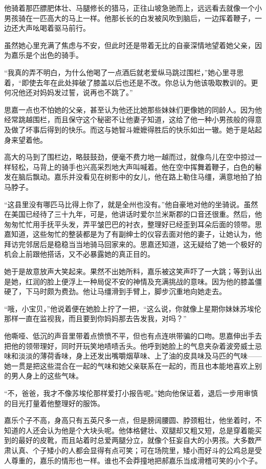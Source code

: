 \par 他骑着那匹膘肥体壮、马腿修长的猎马，正往山坡急驰而上，远远看去就像一个小男孩骑在一匹高大的马上一样。他那长长的白发被风吹到脑后，一边挥着鞭子，一边还大声吆喝着驱马前行。
\par 虽然她心里充满了焦虑与不安，但此时还是带着无比的自豪深情地望着她父亲，因为嘉乐是个出色的骑手。
\par “我真的弄不明白，为什么他喝了一点酒后就老爱纵马跳过围栏，”她心里寻思着，“即使去年在此处摔破了膝盖以后也还是不改。你总认为他该吸取教训的。更何况他还对妈妈发过誓，说再也不跳了。”
\par 思嘉一点也不怕她的父亲，甚至认为他还比她那些妹妹们更像她的同龄人。因为他经常跳越围栏，而且保守这个秘密不让他妻子知道，这给了他一种小男孩般的得意及做了坏事后得到的快乐。而这与她智斗嬷嬷得胜后的快乐如出一辙。她于是站起身来望着他。
\par 高大的马到了围栏边，略鼓鼓劲，便毫不费力地一越而过，就像鸟儿在空中掠过一样轻松，马背上的骑手也兴高采烈地大声叫喊着。他在空中挥舞着鞭子，白色的鬈发在脑后飘动。嘉乐并没看见在树影中的女儿，他在路上勒住马缰，满意地拍了拍马脖子。
\par “这县里没有哪匹马比得上你了，就是全州也没有。”他自豪地对他的坐骑说。虽然在美国已经待了三十九年，可是，他讲话时爱尔兰米斯郡的口音还很重。然后，他匆匆忙忙用手抚平头发，弄平皱巴巴的衬衣，整理好已经歪到耳朵后面的领带。思嘉知道，这些匆忙的整装都是为了有副绅士的仪容去面对他的妻子，让她认为，他拜访完邻居后是稳稳当当地骑马回家来的。思嘉还知道，这无疑给了她一个极好的机会上前跟他搭话，又不必暴露她的真正目的。
\par 她于是故意放声大笑起来。果然不出她所料，嘉乐被这笑声吓了一大跳；等到认出是她，红润的脸上便浮上一种局促不安的神情及充满挑战的意味。因为他的膝盖僵硬了，下马时颇为费劲。他让马缰滑到手臂上，脚步沉重地向她走去。
\par “哦，小宝贝，”他说着便在她脸上拧了一把，“这么说，你就像上星期你妹妹苏埃伦那样一直在监视我，而且要到你妈妈那去告发我，对吗？”
\par 他嘶哑、低沉的声音里带着点愤愤不平，但也有点连哄带骗的口吻。思嘉伸出手去把他的领带理好，同时开玩笑地啧啧舌头。他呼到她脸上的气息夹杂着波旁威士忌味和淡淡的薄荷香味，身上还发出嘴嚼烟草味、上了油的皮具味及马匹的气味——她一贯是把这些混合在一起的气味和她父亲联系在一起的，而且也本能地喜欢上别的男人身上的这些气味。
\par “不，爸爸，我才不像苏埃伦那样爱打小报告呢。”她向他保证着，退后一步用审慎的目光打量着他整理好的服饰。
\par 嘉乐个子不高，身高只有五英尺多一点，但是膀阔腰圆、脖颈粗壮，他坐着时，不知道的人还会认为他是个大块头呢。他体格健壮、双腿却又粗又短，总是穿着能买到的最好的皮靴，而且站着时总爱两腿分立，就像个狂妄自大的小男孩。大多数严肃认真、个子矮小的人都会显得有点可笑；可在场院里，矮小而好斗的公鸡总是受人尊重的，嘉乐的情形也一样。谁也不会莽撞地把郝嘉乐当成滑稽可笑的小个子。
